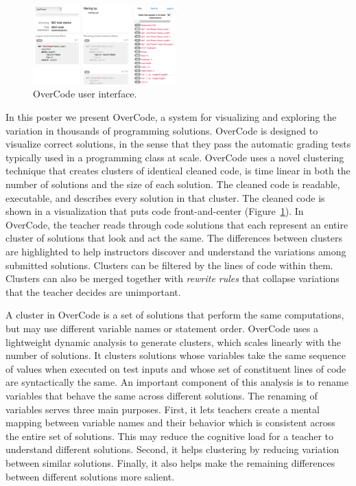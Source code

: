 \documentclass{sigchi}
\begin{document}
\begin{figure}
\centering
\includegraphics[width=0.5\textwidth]{frontPageInterfacePreview.png}
\caption{OverCode user interface.}
\label{fig:figure1}
\end{figure}

In this poster we present OverCode, a system for visualizing and exploring the variation in thousands of programming solutions.  OverCode is designed to visualize correct solutions, in the sense that they pass the automatic grading tests typically used in a programming class at scale.  OverCode uses a novel clustering technique that creates clusters of identical cleaned code, is time linear in both the number of solutions and the size of each solution. The cleaned code is readable, executable, and describes every solution in that cluster.  The cleaned code is shown in a visualization that puts code front-and-center (Figure~\ref{fig:figure1}). In OverCode, the teacher reads through code solutions that each represent an entire cluster of solutions that look and act the same. The differences between clusters are highlighted to help instructors discover and understand the variations among submitted solutions. Clusters can be filtered by the lines of code within them.  Clusters can also be merged together with {\em rewrite rules} that collapse variations that the teacher decides are unimportant. 

A cluster in OverCode is a set of solutions that perform the same computations, but may use different variable names or statement order.  OverCode uses a lightweight dynamic analysis to generate clusters, which scales linearly with the number of solutions. It clusters solutions whose variables take the same sequence of values when executed on test inputs and whose set of constituent lines of code are syntactically the same. An important component of this analysis is to rename variables that behave the same across different solutions. The renaming of variables serves three main purposes. First, it lets teachers create a mental mapping between variable names and their behavior which is consistent across the entire set of solutions. This may reduce the cognitive load for a teacher to understand different solutions. Second, it helps clustering by reducing variation between similar solutions. Finally, it also helps make the remaining differences between different solutions more salient. 
\end{document}

